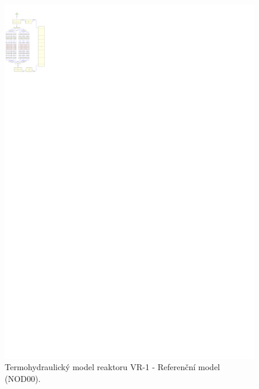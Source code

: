 \begin{figure}
	\centering
	\includegraphics[width=\textwidth, trim={0cm 218cm 148cm 5cm}, clip]{./07_prilohy/prehled_modelu/nod00.pdf}
	\caption{Termohydraulický model reaktoru VR-1 - Referenční model (NOD00).}
	\label{fig:nod_00_prilohy}
\end{figure}
